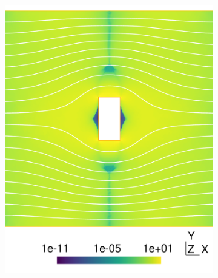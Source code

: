 \documentclass[11 pt]{report}
\begin{document}
\begin{figure}
\begin{subfigure}[t]{0.495\textwidth}
        \includegraphics[width=\textwidth]{../figures/cylinder_1.pdf}
        \label{fig:cylinder1}
    \end{subfigure}
    \begin{subfigure}[t]{0.495\textwidth}

\end{subfigure}
\end{figure}
\end{document}
